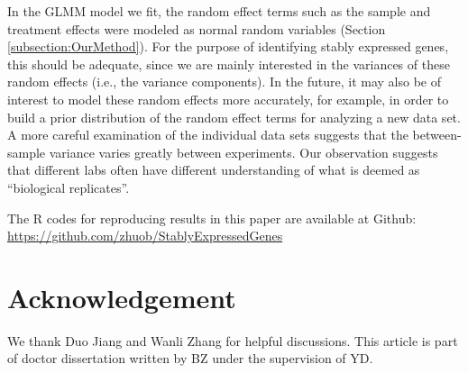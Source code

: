 \documentclass[fleqn,10pt,lineno]{wlpeerj} %
\begin{document}
			
			In the GLMM model we fit, the random effect terms such as the sample and treatment
			effects were modeled as normal random variables (Section
			\ref{subsection:OurMethod}). For the purpose of identifying stably
			expressed genes, this should be adequate, since we are mainly interested in
			the variances of these random effects (i.e., the variance components). In the
			future, it may also be of interest to model these random effects more
			accurately, for example, in order to build a prior distribution of the random
			effect terms for analyzing a new data set. A more careful examination of the
			individual data sets suggests that the between-sample variance varies greatly
			between experiments. Our observation suggests that different labs often have
			different understanding of what is deemed as ``biological replicates''.
			
			The R codes for reproducing results in this paper are available at Github:
			\url{https://github.com/zhuob/StablyExpressedGenes}
			
			\section*{Acknowledgement}	
			
			We thank Duo Jiang and Wanli Zhang for helpful 
			discussions. This article is part of doctor dissertation written by BZ under the 
			supervision of YD. 
			
%			
%			
			
\end{document}

